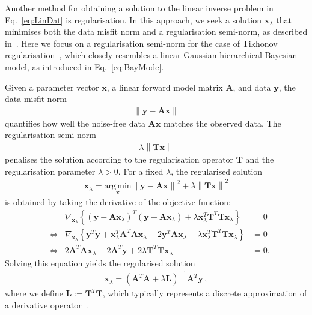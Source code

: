 Another method for obtaining a solution to the linear inverse problem in Eq.~\ref{eq:LinDat} is regularisation. In this approach, we seek a solution $\bm{x}_{\lambda}$ that minimises both the data misfit norm and a regularisation semi-norm, as described in~\cite{fox2016fast}. Here we focus on a regularisation semi-norm for the case of Tikhonov regularisation~\cite{kaipio2005statinv, tan2016LecNot}, which closely resembles a linear-Gaussian hierarchical Bayesian model, as introduced in Eq.~\ref{eq:BayMode}.

Given a parameter vector $\bm{x}$, a linear forward model matrix $\bm{A}$, and data $\bm{y}$, the data misfit norm
\begin{align}
	\left\lVert \bm{y} - \bm{A} \bm{x} \right\rVert
\end{align}
quantifies how well the noise-free data  $\bm{A}\bm{x}$ matches the observed data.
The regularisation semi-norm
\begin{align}
	\lambda \left\lVert \bm{T} \bm{x} \right\rVert
\end{align}
penalises the solution according to the regularisation operator $\bm{T}$ and the regularisation parameter $\lambda > 0$.
For a fixed $\lambda$, the regularised solution
\begin{align}
	\bm{x}_{\lambda} = \underset{\bm{x}}{\mathrm{arg\,min}} \left\lVert \bm{y} - \bm{A} \bm{x} \right\rVert^2 + \lambda \left\lVert \bm{T} \bm{x} \right\rVert^2
\end{align}
is obtained by taking the derivative of the objective function:
\begin{align}
	& & \nabla_{\bm{x}_{\lambda}} \left\{ (\bm{y} - \bm{A} \bm{x}_{\lambda})^T (\bm{y} - \bm{A} \bm{x}_{\lambda}) + \lambda \bm{x}_{\lambda}^T \bm{T}^T \bm{T} \bm{x}_{\lambda} \right\} &= 0 \\
	&\iff & \nabla_{\bm{x}_{\lambda}} \left\{ \bm{y}^T \bm{y} + \bm{x}_{\lambda}^T \bm{A}^T \bm{A} \bm{x}_{\lambda} - 2 \bm{y}^T \bm{A} \bm{x}_{\lambda} + \lambda \bm{x}_{\lambda}^T \bm{T}^T \bm{T} \bm{x}_{\lambda} \right\} &= 0 \\
	&\iff & 2 \bm{A}^T \bm{A} \bm{x}_{\lambda} - 2 \bm{A}^T \bm{y} + 2 \lambda \bm{T}^T \bm{T} \bm{x}_{\lambda} &= 0.
\end{align}
Solving this equation yields the regularised solution
\begin{align}
	\bm{x}_{\lambda} = (\bm{A}^T \bm{A} + \lambda \bm{L})^{-1} \bm{A}^T \bm{y} \, ,
\end{align}
where we define $\bm{L} := \bm{T}^T \bm{T}$, which typically represents a discrete approximation of a derivative operator~\cite{tan2016LecNot}.


